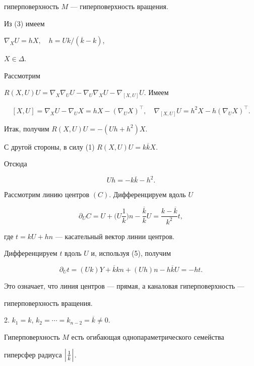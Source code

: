 гиперповерхность $M$ --- гиперповерхность вращения.


Из (3) имеем


$\nabla_{X}U=hX,\quad h=Uk/(\overline{k}-k)$,


$X\in \Delta$.


Рассмотрим


$R(X,U)U=\nabla_X\nabla_UU-\nabla_U\nabla_XU-\nabla_{[X,U]}U.$ Имеем


$$


[X,U]=\nabla_X U-\nabla_U X = hX -(\nabla_U X)^{\top},\quad


\nabla_{[X ,U]} U = h^2 X -h(\nabla_U X)^{\top}.


$$


Итак, получим $R(X,U)U=-(Uh+h^2)X$.


С другой стороны, в силу (1) $R(X, U)U = k\overline{k} X$.


Отсюда


\begin{equation}


U h = - k\overline{k} - h^2.


\end{equation}


Рассмотрим линию центров $(C)$. Дифференцируем вдоль $U$


$$


\partial_U C = U + \bigg(U \frac{1}{k}\bigg)n - \frac{\overline{k}}{k}U=


\frac{k-\overline{k}}{k^2}t,


$$


где $t=k U+hn$ --- касательный вектор линии центров.


Дифференцируем $t$ вдоль $U$ и, используя (5), получим


$$


\partial_U t=(U k)Y+\overline{k}k n+(U h)n-h\overline{k} U = -ht.


$$


Это означает, что линия центров --- прямая, а каналовая гиперповерхность ---


гиперповерхность вращения.


\smallskip





2. $k_1=k$, $k_2=\dotsb =k_{n-2}=\overline{k}\ne 0.$


Гиперповерхность $M$ есть огибающая однопараметрического семейства


гиперсфер радиуса $\Bigl|\frac{1}{\Bar{k}}\Bigr|$.


